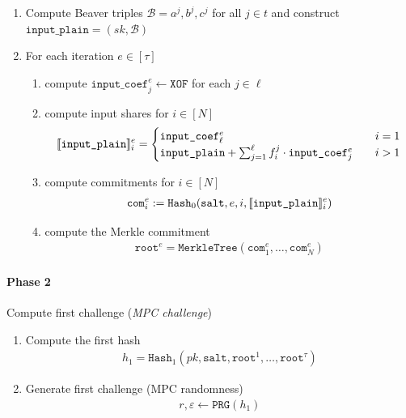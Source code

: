 \documentclass[11pt]{report}
\theoremstyle{definition}
\theoremstyle{plain}
\begin{document}
\begin{protocol}
  \begin{enumerate}[itemsep=0pt, topsep=0pt, parsep=0pt]
    \item Compute Beaver triples $\mathcal{B} = a^{j}, b^{j}, c^{j}$ for all $j \in t$ and construct $\texttt{input\_plain} = (sk, \mathcal{B})$
    \item For each iteration $e \in [\tau]$
          \begin{enumerate}[itemsep=0pt, topsep=2pt, parsep=0pt]
            \item compute $\texttt{input\_coef}_j^e \leftarrow \texttt{XOF}$ for each $j \in \ell$
            \item compute input shares for $i \in [N]$
                  \begin{align*}
                    \llbracket \texttt{input\_plain} \rrbracket_i^e =
                    \begin{cases}
                      \texttt{input\_coef}^e_{\ell}                                                & \quad i = 1 \\
                      \texttt{input\_plain} + \sum_{j=1}^\ell f_i^j \cdot \texttt{input\_coef}_j^e & \quad i > 1
                    \end{cases}
                  \end{align*}
            \item compute commitments for $i \in [N]$
                  \begin{align*}
                    \texttt{com}_i^{e} := \texttt{Hash}_0(\texttt{salt}, e, i, \llbracket \texttt{input\_plain} \rrbracket_i^e)
                  \end{align*}
            \item compute the Merkle commitment
                  \begin{align*}
                    \texttt{root}^{e} = \texttt{MerkleTree}(\texttt{com}_1^{e}, \ldots, \texttt{com}_N^{e})
                  \end{align*}
          \end{enumerate}
  \end{enumerate}

  \paragraph{Phase 2} Compute first challenge (\textit{MPC challenge})
  \begin{enumerate}[itemsep=0pt, topsep=0pt, parsep=0pt]
    \item Compute the first hash
          \begin{align*}
            h_1 = \texttt{Hash}_1(pk, \texttt{salt}, \texttt{root}^{1}, \ldots, \texttt{root}^{\tau})
          \end{align*}
    \item Generate first challenge (MPC randomness)
          \begin{align*}
            r, \varepsilon \leftarrow \texttt{PRG}(h_1)
          \end{align*}
  \end{enumerate}


\end{protocol}
\end{document}
